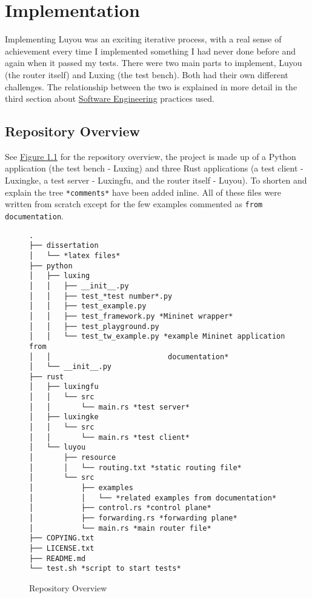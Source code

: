\documentclass[12pt,a4paper,twoside,openright]{report}
\begin{document}
\chapter{Implementation}
\label{chap::implementation}

Implementing Luyou was an exciting iterative process, with a real sense of achievement every time I implemented something I had never done before and again when it passed my tests.  There were two main parts to implement, Luyou (the router itself) and Luxing (the test bench).  Both had their own different challenges.  The relationship between the two is explained in more detail in the third section about \hyperref[sec::soft_eng] {Software Engineering} practices used.


\section*{Repository Overview}

See \hyperref[fig::repository_overview]{Figure }\ref{fig::repository_overview} for the repository overview, the project is made up of a Python application (the test bench - Luxing) and three Rust applications (a test client - Luxingke, a test server - Luxingfu, and the router itself - Luyou). To shorten and explain the tree \verb!*comments*! have been added inline. All of these files were written from scratch except for the few examples commented as \verb!from documentation!. 

\begin{figure}
\begin{lstlisting}[style=tree]
.
├── dissertation
│   └── *latex files*
├── python
│   ├── luxing
│   │   ├── __init__.py
│   │   ├── test_*test number*.py
│   │   ├── test_example.py
│   │   ├── test_framework.py *Mininet wrapper*
│   │   ├── test_playground.py 
│   │   └── test_tw_example.py *example Mininet application from
│   │                           documentation*
│   └── __init__.py
├── rust
│   ├── luxingfu
│   │   └── src
│   │       └── main.rs *test server*
│   ├── luxingke
│   │   └── src
│   │       └── main.rs *test client*
│   └── luyou
│       ├── resource
│       │   └── routing.txt *static routing file*
│       └── src
│           ├── examples
│           │   └── *related examples from documentation*
│           ├── control.rs *control plane*
│           ├── forwarding.rs *forwarding plane*
│           └── main.rs *main router file*
├── COPYING.txt
├── LICENSE.txt
├── README.md
└── test.sh *script to start tests*
\end{lstlisting}
\caption{Repository Overview}
\label{fig::repository_overview}
\end{figure}
\end{document}
